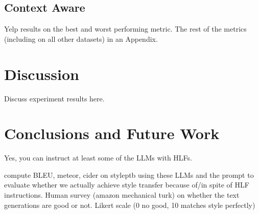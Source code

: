 \documentclass[runningheads,a4paper,11pt]{article}
\begin{document}
\subsection{Context Aware}

Yelp results on the best and worst performing metric.
The rest of the metrics (including on all other datasets) in an Appendix.

\section{Discussion}

Discuss experiment results here.

\section{Conclusions and Future Work}

Yes, you can instruct at least some of the LLMs with HLFs.

compute BLEU, meteor, cider on styleptb using these LLMs and the prompt to
evaluate whether we actually achieve style transfer because of/in spite of HLF
instructions.
Human survey (amazon mechanical turk) on whether the text generations are good
or not. Likert scale (0 no good, 10 matches style perfectly)



\end{document}
